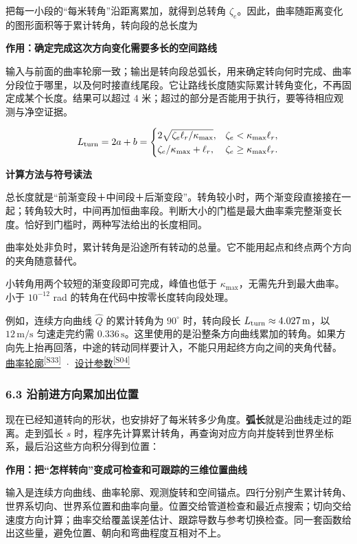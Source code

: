 \documentclass[12pt,a4paper]{article}
\numberwithin{equation}{topic}
\newcommand{\sourceref}[2]{\hyperlink{source-#1}{#2\textsuperscript{[#1]}}}
\begin{document}
把每一小段的“每米转角”沿距离累加，就得到总转角 \(\zeta_e\)。因此，曲率随距离变化的图形面积等于累计转角，转向段的总长度为

\noindent\textbf{作用：确定完成这次方向变化需要多长的空间路线}\par\nobreak
输入与前面的曲率轮廓一致；输出是转向段总弧长，用来确定转向何时完成、曲率分段位于哪里，以及何时接直线尾段。它让路线长度随实际累计转角变化，不再固定成某个长度。结果可以超过 4 米；超过的部分是否能用于执行，要等待相应观测与净空证据。

\begin{equation}
\label{eq:turn-length}
L_{\rm turn}=2a+b=
\begin{cases}
2\sqrt{\zeta_e\ell_r/\kappa_{\max}},&
\zeta_e<\kappa_{\max}\ell_r,\\
\zeta_e/\kappa_{\max}+\ell_r,&
\zeta_e\ge\kappa_{\max}\ell_r.
\end{cases}
\end{equation}

\noindent\textbf{计算方法与符号读法}\par\nobreak
总长度就是“前渐变段＋中间段＋后渐变段”。转角较小时，两个渐变段直接接在一起；转角较大时，中间再加恒曲率段。判断大小的门槛是最大曲率乘完整渐变长度。恰好到门槛时，两种写法给出的长度相同。

曲率处处非负时，累计转角是沿途所有转动的总量。它不能用起点和终点两个方向的夹角随意替代。


小转角用两个较短的渐变段即可完成，峰值也低于 \(\kappa_{\max}\)，无需先升到最大曲率。小于 \(10^{-12}\) rad 的转角在代码中按零长度转向段处理。

例如，连续方向曲线 \(\widehat Q\) 的累计转角为 \(90^\circ\) 时，转向段长 \(L_{\rm turn}\approx4.027\,\mathrm m\)，以 \(12\,\mathrm{m/s}\) 匀速走完约需 \(0.336\,\mathrm s\)。这里使用的是沿整条方向曲线累加的转角。如果方向先上抬再回落，中途的转动同样要计入，不能只用起终方向之间的夹角代替。 \sourceref{S33}{曲率轮廓} · \sourceref{S04}{设计参数}

\subsubsection*{6.3 沿前进方向累加出位置}

现在已经知道转向的形状，也安排好了每米转多少角度。\textbf{弧长}就是沿曲线走过的距离。走到弧长 \(s\) 时，程序先计算累计转角，再查询对应方向并旋转到世界坐标系，最后沿这些方向积分得到位置：

\noindent\textbf{作用：把“怎样转向”变成可检查和可跟踪的三维位置曲线}\par\nobreak
输入是连续方向曲线、曲率轮廓、观测旋转和空间锚点。四行分别产生累计转角、世界系切向、世界系位置和曲率向量。位置交给管道检查和最近点搜索；切向交给速度方向计算；曲率交给覆盖误差估计、跟踪导数与参考切换检查。同一套函数给出这些量，避免位置、朝向和弯曲程度互相对不上。
\end{document}
